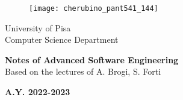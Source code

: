 \begin{titlepage}
	\begin{figure}[!htb]
		\centering
		\texttt{[image: cherubino\_pant541\_144]}
	\end{figure}
	
	\begin{center}
		\LARGE{University of Pisa}
		\vspace{5mm}
		\\ \large{Computer Science Department }
		
	\end{center}
	
	\vspace{15mm}
	\begin{center}
		{\LARGE{\bf Notes of Advanced Software Engineering}{\\\vspace{15mm}\small Based on the lectures of A. Brogi, S. Forti}}
	\end{center}
	\vspace{30mm}
	
	\begin{center}
		{\normalsize\vspace{3mm}
			\bf \large{A.Y. 2022-2023}}
	\end{center}
	
	
\end{titlepage}